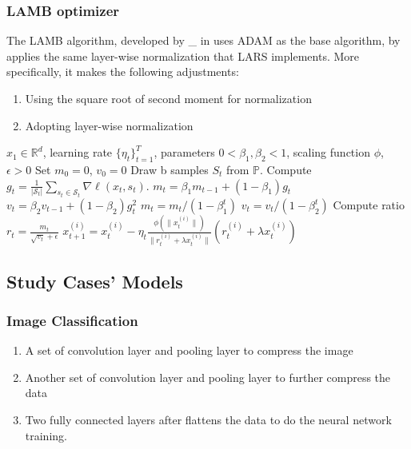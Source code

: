 \subsubsection{LAMB optimizer}

The LAMB algorithm, developed by \_ in \cite{You2020Large} uses ADAM as the base algorithm, by applies the same layer-wise normalization that LARS implements. More specifically, it makes the following adjustments:
\begin{enumerate}
    \item Using the square root of second moment for normalization
    \item Adopting layer-wise normalization
\end{enumerate}
\begin{minipage}[b]{.5\textwidth}
\begin{algorithm}[H]\small
	\caption{$LAMB$ \cite{You2020Large}}
	\label{alg:lamb}
	\begin{algorithmic}
		 $x_1 \in \mathbb{R}^d$, learning rate $\{\eta_t\}_{t=1}^T$,  parameters $0 < \beta_{1}, \beta_2 < 1$, scaling function $\phi$, $\epsilon > 0$
		\STATE Set $m_{0} = 0$, $v_{0} = 0$
		\STATE Draw b samples $S_t$ from $\mathbb{P}$.
        \STATE Compute $g_t = \frac{1}{|\mathcal{S}_t|} \sum_{s_t \in \mathcal{S}_t}\nabla \ell(x_t, s_t)$.
		\STATE  $m_{t} = \beta_{1} m_{t-1} + (1 - \beta_{1}) g_{t}$ 
		\STATE  $v_{t} = \beta_{2} v_{t-1} + (1 - \beta_{2}) g_{t}^2$
		\STATE $m_t = m_t/(1 - {\beta}_1^t)$ 
        \STATE $v_t = v_t/(1 - {\beta}_2^t)$
		\STATE Compute ratio $r_t = \frac{m_t}{\sqrt{v_t} + \epsilon}$
		\STATE $x_{t+1}^{(i)} = x_{t}^{(i)} - \eta_t \frac{\phi(\|x_t^{(i)}\|)}{\|r_t^{(i)} + \lambda x_t^{(i)}\|} (r_t^{(i)} + \lambda x_t^{(i)})$
		\ENDFOR
	\end{algorithmic}
\end{algorithm}
\end{minipage}

\subsection{Study Cases' Models}




\subsubsection{Image Classification}

\begin{enumerate}[start=1,label={\bfseries\arabic*:}]
    \item A set of convolution layer and pooling layer to compress the image
    \item Another set of convolution layer and pooling layer to further compress the data
    \item Two fully connected layers after flattens the data to do the neural network training.
    \end{enumerate}
    
